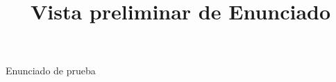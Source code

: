 \documentclass[a4paper,12pt]{article}\usepackage[spanish]{babel}\usepackage{times}
\title{Vista preliminar de Enunciado}
\begin{document}
\twocolumn 

\maketitle

Enunciado de prueba
\end{document}
